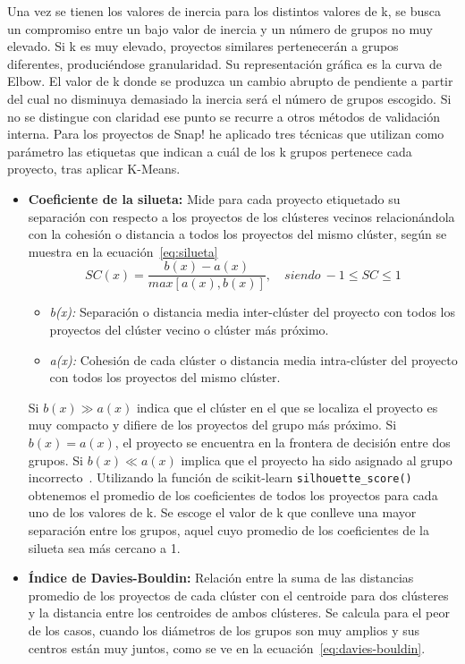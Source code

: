 \documentclass[a4paper, 12pt]{book}
\begin{document}
Una vez se tienen los valores de inercia para los distintos valores de k, se busca un compromiso entre un bajo valor de inercia y un número de grupos no muy elevado. Si k es muy elevado, proyectos similares pertenecerán a grupos diferentes, produciéndose granularidad. Su representación gráfica es la curva de Elbow. El valor de k donde se produzca un cambio abrupto de pendiente a partir del cual no disminuya demasiado la inercia será el número de grupos escogido. Si no se distingue con claridad ese punto se recurre a otros métodos de validación interna. Para los proyectos de Snap! he aplicado tres técnicas que utilizan como parámetro las etiquetas que indican a cuál de los k grupos pertenece cada proyecto, tras aplicar K-Means. 

\begin{itemize}
    \item \textbf{Coeficiente de la silueta:} Mide para cada proyecto etiquetado su separación con respecto a los proyectos de los clústeres vecinos relacionándola con la cohesión o distancia a todos los proyectos del mismo clúster, según se muestra en la ecuación~\eqref{eq:silueta}
    \begin{equation}
        SC(x)=\frac {b(x)-a(x)}{max[a(x),b(x)]},\quad\mathit{siendo}\ -1\leq SC \leq1
        \label{eq:silueta}
    \end{equation}   
    \begin{itemize}
        \item \emph{b(x):} Separación o distancia media inter-clúster del proyecto con todos los proyectos del clúster vecino o clúster más próximo.
        \item \emph{a(x):} Cohesión de cada clúster o distancia media intra-clúster del proyecto con todos los proyectos del mismo clúster.
    \end{itemize}
    Si $b(x)\gg a(x)$ indica que el clúster en el que se localiza el proyecto es muy compacto y difiere de los proyectos del grupo más próximo. Si $b(x)= a(x)$, el proyecto se encuentra en la frontera de decisión entre dos grupos. Si $b(x)\ll a(x)$ implica que el proyecto ha sido asignado al grupo incorrecto~\cite{rousseeuv_87}. Utilizando la función de scikit-learn \texttt{silhouette\_score()} obtenemos el promedio de los coeficientes de todos los proyectos para cada uno de los valores de k. Se escoge el valor de k que conlleve una mayor separación entre los grupos, aquel cuyo promedio de los coeficientes de la silueta sea más cercano a 1. 
    \item \textbf{Índice de Davies-Bouldin:} Relación entre la suma de las distancias promedio de los proyectos de cada clúster con el centroide para dos clústeres y la distancia entre los centroides de ambos clústeres. Se calcula para el peor de los casos, cuando los diámetros de los grupos son muy amplios y sus centros están muy juntos, como se ve en la ecuación~\eqref{eq:davies-bouldin}. 

\end{itemize}
\end{document}
